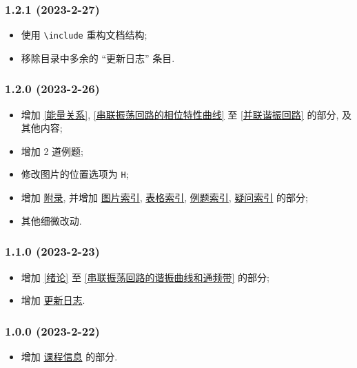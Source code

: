 \subsubsection*{1.2.1 (2023-2-27)}
\begin{itemize}
    \item 使用 \texttt{\textbackslash include} 重构文档结构;
    \item 移除目录中多余的 ``更新日志'' 条目.
\end{itemize}

\subsubsection*{1.2.0 (2023-2-26)}
\begin{itemize}
    \item 增加 \ref{能量关系}, \ref{串联振荡回路的相位特性曲线} 至 \ref{并联谐振回路} 的部分, 及其他内容;
    \item 增加 2 道例题;
    \item 修改图片的位置选项为 \texttt{H};
    \item 增加 \hyperref[附录]{附录}, 并增加 \hyperref[图片索引]{图片索引}, \hyperref[表格索引]{表格索引}, \hyperref[例题索引]{例题索引}, \hyperref[疑问索引]{疑问索引} 的部分;
    \item 其他细微改动.
\end{itemize}

\subsubsection*{1.1.0 (2023-2-23)}
\begin{itemize}
    \item 增加 \ref{绪论} 至 \ref{串联振荡回路的谐振曲线和通频带} 的部分;
    \item 增加 \hyperref[更新日志]{更新日志}.
\end{itemize}

\subsubsection*{1.0.0 (2023-2-22)}
\begin{itemize}
    \item 增加 \hyperref[课程信息]{课程信息} 的部分.
\end{itemize}

